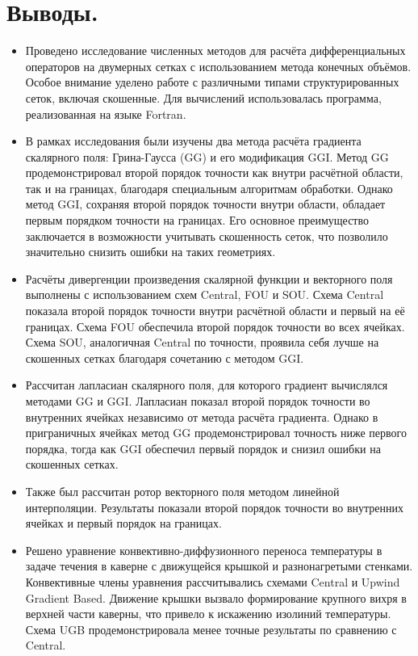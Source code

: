 \section{Выводы.}
\begin{itemize}
    \item Проведено исследование численных методов для расчёта дифференциальных операторов на двумерных сетках с использованием метода конечных объёмов. Особое внимание уделено работе с различными типами структурированных сеток, включая скошенные. Для вычислений использовалась программа, реализованная на языке Fortran.

    \item В рамках исследования были изучены два метода расчёта градиента скалярного поля: Грина-Гаусса (GG) и его модификация GGI. Метод GG продемонстрировал второй порядок точности как внутри расчётной области, так и на границах, благодаря специальным алгоритмам обработки. Однако метод GGI, сохраняя второй порядок точности внутри области, обладает первым порядком точности на границах. Его основное преимущество заключается в возможности учитывать скошенность сеток, что позволило значительно снизить ошибки на таких геометриях.
    
    \item Расчёты дивергенции произведения скалярной функции и векторного поля выполнены с использованием схем Central, FOU и SOU. Схема Central показала второй порядок точности внутри расчётной области и первый на её границах. Схема FOU обеспечила второй порядок точности во всех ячейках. Схема SOU, аналогичная Central по точности, проявила себя лучше на скошенных сетках благодаря сочетанию с методом GGI.
    
    \item Рассчитан лапласиан скалярного поля, для которого градиент вычислялся методами GG и GGI. Лапласиан показал второй порядок точности во внутренних ячейках независимо от метода расчёта градиента. Однако в приграничных ячейках метод GG продемонстрировал точность ниже первого порядка, тогда как GGI обеспечил первый порядок и снизил ошибки на скошенных сетках.
    
    \item Также был рассчитан ротор векторного поля методом линейной интерполяции. Результаты показали второй порядок точности во внутренних ячейках и первый порядок на границах.
    
    \item Решено уравнение конвективно-диффузионного переноса температуры в задаче течения в каверне с движущейся крышкой и разнонагретыми стенками. Конвективные члены уравнения рассчитывались схемами Central и Upwind Gradient Based. Движение крышки вызвало формирование крупного вихря в верхней части каверны, что привело к искажению изолиний температуры. Схема UGB продемонстрировала менее точные результаты по сравнению с Central.
    

\end{itemize}
